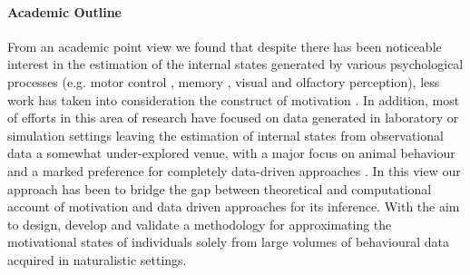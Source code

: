 \paragraph*{Academic Outline}
From an academic point view we found that despite there has been noticeable interest in the estimation of the internal states generated by various psychological processes (e.g. motor control \cite{gallego2017neural}, memory \cite{derdikman2011manifold, nieh2021geometry}, visual \cite{seung2000manifold, ganmor2015thesaurus} and olfactory \cite{stopfer2003intensity} perception), less work has taken into consideration the construct of motivation \cite{mcclure2003computational, zhang2009neural}. In addition, most of efforts in this area of research have focused on data generated in laboratory or simulation settings \cite{eyjolfsdottir2016learning, song2017reward, merel2019deep,calhoun2019unsupervised, seung2000manifold, pang2016dimensionality, luxem2020identifying, pereira2020quantifying, mccullough2021unsupervised, shi2021learning} leaving the estimation of internal states from observational data a somewhat under-explored venue, with a major focus on animal behaviour and a marked preference for completely data-driven approaches \cite{luxem2020identifying,pereira2020quantifying, mccullough2021unsupervised}. In this view our approach has been to bridge the gap between theoretical and computational account of motivation and data driven approaches for its inference. With the aim to design, develop and validate a methodology for approximating the motivational states of individuals solely from large volumes of behavioural data acquired in naturalistic settings. 

